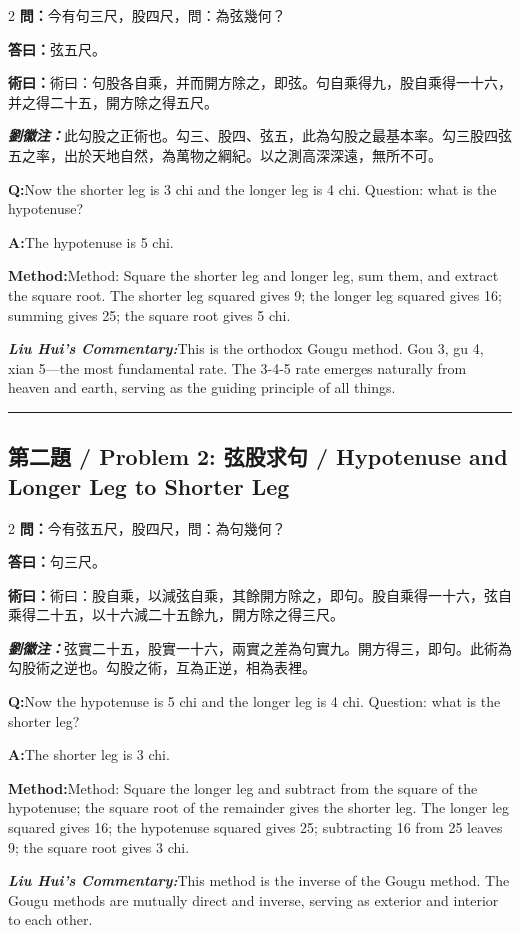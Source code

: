\documentclass[11pt,a4paper]{article}
\newcommand{\cnwen}{\textcolor{cnlabelfg}{\textbf{問：}}}
\newcommand{\cnda}{\textbf{答曰：}}
\newcommand{\cnshu}{\textcolor{cnlabelfg}{\textbf{術曰：}}}
\newcommand{\cnzhu}{\textcolor{commentarycolor}{\textit{\textbf{劉徽注：}}}}
\newcommand{\enwen}{\textcolor{enlabelfg}{\textbf{Q:}}}
\newcommand{\enda}{\textcolor{enlabelfg}{\textbf{A:}}}
\newcommand{\enshu}{\textcolor{enlabelfg}{\textbf{Method:}}}
\newcommand{\enzhu}{\textcolor{enlabelfg}{\textit{\textbf{Liu Hui's Commentary:}}}}
\begin{document}
\begin{paracol}{2}
\switchcolumn[0]
\cnwen 今有句三尺，股四尺，問：為弦幾何？

\cnda 弦五尺。

\cnshu 術曰：句股各自乘，并而開方除之，即弦。句自乘得九，股自乘得一十六，并之得二十五，開方除之得五尺。

\cnzhu 此勾股之正術也。勾三、股四、弦五，此為勾股之最基本率。勾三股四弦五之率，出於天地自然，為萬物之綱紀。以之測高深深遠，無所不可。

\switchcolumn[1]
\enwen Now the shorter leg is 3 chi and the longer leg is 4 chi. Question: what is the hypotenuse?

\enda The hypotenuse is 5 chi.

\enshu Method: Square the shorter leg and longer leg, sum them, and extract the square root. The shorter leg squared gives 9; the longer leg squared gives 16; summing gives 25; the square root gives 5 chi.

\enzhu This is the orthodox Gougu method. Gou 3, gu 4, xian 5---the most fundamental rate. The 3-4-5 rate emerges naturally from heaven and earth, serving as the guiding principle of all things.
\end{paracol}

\bigskip\hrule\bigskip

\subsection{第二題 / Problem 2: 弦股求句 / Hypotenuse and Longer Leg to Shorter Leg}

\begin{paracol}{2}
\switchcolumn[0]
\cnwen 今有弦五尺，股四尺，問：為句幾何？

\cnda 句三尺。

\cnshu 術曰：股自乘，以減弦自乘，其餘開方除之，即句。股自乘得一十六，弦自乘得二十五，以十六減二十五餘九，開方除之得三尺。

\cnzhu 弦實二十五，股實一十六，兩實之差為句實九。開方得三，即句。此術為勾股術之逆也。勾股之術，互為正逆，相為表裡。

\switchcolumn[1]
\enwen Now the hypotenuse is 5 chi and the longer leg is 4 chi. Question: what is the shorter leg?

\enda The shorter leg is 3 chi.

\enshu Method: Square the longer leg and subtract from the square of the hypotenuse; the square root of the remainder gives the shorter leg. The longer leg squared gives 16; the hypotenuse squared gives 25; subtracting 16 from 25 leaves 9; the square root gives 3 chi.

\enzhu This method is the inverse of the Gougu method. The Gougu methods are mutually direct and inverse, serving as exterior and interior to each other.
\end{paracol}
\end{document}
